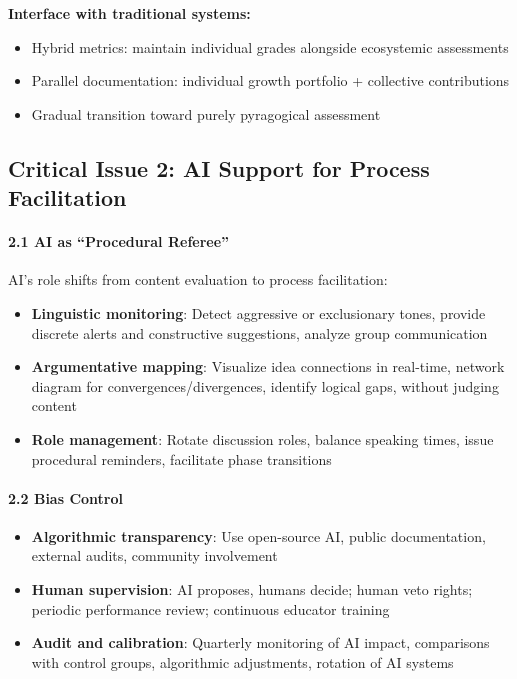 \textbf{Interface with traditional systems:}
\begin{itemize}
	\item Hybrid metrics: maintain individual grades alongside ecosystemic assessments
	\item Parallel documentation: individual growth portfolio + collective contributions
	\item Gradual transition toward purely pyragogical assessment
\end{itemize}

\subsection{Critical Issue 2: AI Support for Process Facilitation}

\paragraph{2.1 AI as ``Procedural Referee''}
AI's role shifts from content evaluation to process facilitation:
\begin{itemize}
	\item \textbf{Linguistic monitoring}: Detect aggressive or exclusionary tones, provide discrete alerts and constructive suggestions, analyze group communication
	\item \textbf{Argumentative mapping}: Visualize idea connections in real-time, network diagram for convergences/divergences, identify logical gaps, without judging content
	\item \textbf{Role management}: Rotate discussion roles, balance speaking times, issue procedural reminders, facilitate phase transitions
\end{itemize}

\paragraph{2.2 Bias Control}
\begin{itemize}
	\item \textbf{Algorithmic transparency}: Use open-source AI, public documentation, external audits, community involvement
	\item \textbf{Human supervision}: AI proposes, humans decide; human veto rights; periodic performance review; continuous educator training
	\item \textbf{Audit and calibration}: Quarterly monitoring of AI impact, comparisons with control groups, algorithmic adjustments, rotation of AI systems
\end{itemize}

